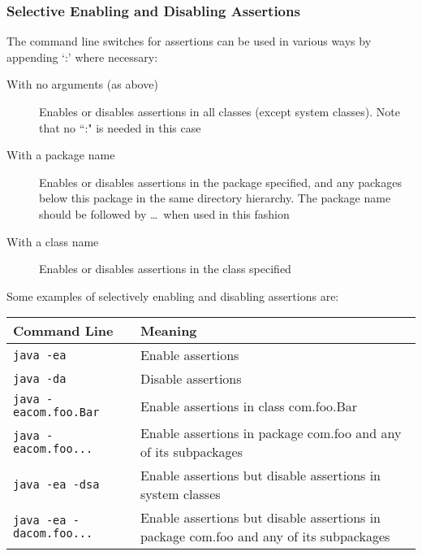\subsubsection{Selective Enabling and Disabling Assertions}
The command line switches for assertions can be used in various ways by 
appending `:' where necessary:
\begin{description}
    \item[With no arguments (as above)] Enables or disables assertions in all 
    classes (except system classes). Note that no ``:" is needed in this case
    \item[With a package name] Enables or disables assertions in the package 
    specified, and any packages below this package in the same directory 
    hierarchy. The package name should be followed by \ldots\ when used in this 
    fashion
    \item[With a class name] Enables or disables assertions in the class 
    specified
\end{description}
Some examples of selectively enabling and disabling assertions are:
\begin{center}
    \begin{tabular}{lp{}}
        \textbf{Command Line} & \textbf{Meaning} \\
        \hline
        \verb#java -ea# & Enable assertions \\
        \hline
        \verb#java -da# & Disable assertions \\
        \hline
        \verb#java -eacom.foo.Bar# & Enable assertions in class com.foo.Bar \\
        \hline
        \verb#java -eacom.foo...# & Enable assertions in package com.foo and 
        any of its subpackages \\
        \hline
        \verb#java -ea -dsa# & Enable assertions but disable assertions in 
        system classes \\
        \hline
        \verb#java -ea -dacom.foo...# & Enable assertions but disable 
        assertions in package com.foo and any of its subpackages \\
    \end{tabular}
\end{center}

